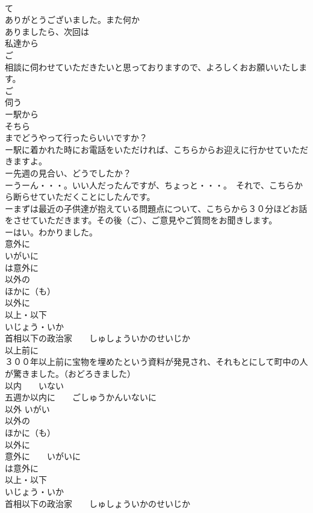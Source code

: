 \documentclass[8pt]{extreport}
\begin{document}
\begin{CJK}{UTF8}{min}
\\	て
\\	ありがとうございました。また何か
\\	ありましたら、次回は
\\	私達から
\\	ご
\\	相談に伺わせていただきたいと思っておりますので、よろしくおお願いいたします。
\\	ご 
\\	伺う 
\\	ー駅から
\\	そちら
\\	までどうやって行ったらいいですか？
\\	ー駅に着かれた時にお電話をいただければ、こちらからお迎えに行かせていただきますよ。
\\	ー先週の見合い、どうでしたか？
\\	ーうーん・・・。いい人だったんですが、ちょっと・・・。　それで、こちらから断らせていただくことにしたんです。
\\	ーまずは最近の子供達が抱えている問題点について、こちらから３０分ほどお話をさせていただきます。その後（ご）、ご意見やご質問をお聞きします。
\\	ーはい。わかりました。	
\\	意外に
\\	いがいに
\\	は意外に
\\	以外の
\\	ほかに（も） 
\\	以外に
\\	以上・以下
\\	いじょう・いか
\\	首相以下の政治家　　しゅしょういかのせいじか
\\	以上前に
\\	３００年以上前に宝物を埋めたという資料が発見され、それもとにして町中の人が驚きました。（おどろきました）
\\	以内　　いない
\\	五週か以内に　　ごしゅうかんいないに
\\	以外	いがい
\\	以外の
\\	ほかに（も） 
\\	以外に
\\	意外に　　いがいに
\\	は意外に
\\	以上・以下
\\	いじょう・いか
\\	首相以下の政治家　　しゅしょういかのせいじか

\end{CJK}
\end{document}
